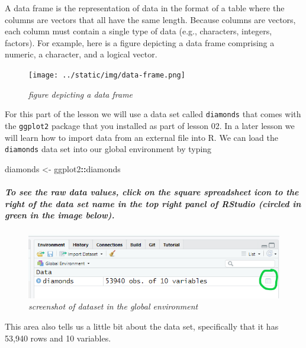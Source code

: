 \documentclass[
]{article}
\newenvironment{Shaded}{\begin{snugshade}}{\end{snugshade}}
\newcommand{\NormalTok}[1]{#1}
\newcommand{\OperatorTok}[1]{\textcolor[rgb]{0.81,0.36,0.00}{\textbf{#1}}}
\newcommand{\StringTok}[1]{\textcolor[rgb]{0.31,0.60,0.02}{#1}}
\begin{document}
A data frame is the representation of data in the format of a table
where the columns are vectors that all have the same length. Because
columns are vectors, each column must contain a single type of data
(e.g., characters, integers, factors). For example, here is a figure
depicting a data frame comprising a numeric, a character, and a logical
vector.

\begin{figure}
\centering
\texttt{[image: ../static/img/data-frame.png]}
\caption{\emph{figure depicting a data frame}}
\end{figure}

For this part of the lesson we will use a data set called
\texttt{diamonds} that comes with the \texttt{ggplot2} package that you
installed as part of lesson 02. In a later lesson we will learn how to
import data from an external file into R. We can load the
\texttt{diamonds} data set into our global environment by typing

\begin{Shaded}
\begin{Highlighting}[]
\NormalTok{diamonds <-}\StringTok{ }\NormalTok{ggplot2}\OperatorTok{::}\NormalTok{diamonds}
\end{Highlighting}
\end{Shaded}

\hypertarget{to-see-the-raw-data-values-click-on-the-square-spreadsheet-icon-to-the-right-of-the-data-set-name-in-the-top-right-panel-of-rstudio-circled-in-green-in-the-image-below.}{%
\subparagraph{To see the raw data values, click on the square
spreadsheet icon to the right of the data set name in the top right
panel of RStudio (circled in green in the image
below).}\label{to-see-the-raw-data-values-click-on-the-square-spreadsheet-icon-to-the-right-of-the-data-set-name-in-the-top-right-panel-of-rstudio-circled-in-green-in-the-image-below.}}

\begin{figure}
\centering
\includegraphics{../static/img/data.PNG}
\caption{\emph{screenshot of dataset in the global environment}}
\end{figure}

This area also tells us a little bit about the data set, specifically
that it has 53,940 rows and 10 variables.
\end{document}
